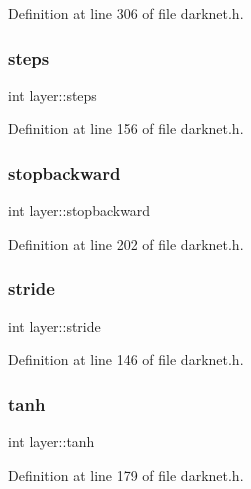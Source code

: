 Definition at line 306 of file darknet.\+h.

\mbox{\label{structlayer_ad060e2cc161c5aa290a76613d024f03a}} 
\subsubsection{\texorpdfstring{steps}{steps}}
{\footnotesize\ttfamily int layer\+::steps}



Definition at line 156 of file darknet.\+h.

\mbox{\label{structlayer_ada9c281fad0eae687276387e0dc5d8d1}} 
\subsubsection{\texorpdfstring{stopbackward}{stopbackward}}
{\footnotesize\ttfamily int layer\+::stopbackward}



Definition at line 202 of file darknet.\+h.

\mbox{\label{structlayer_a239bfd11f56b41f70e2933333f80c81b}} 
\subsubsection{\texorpdfstring{stride}{stride}}
{\footnotesize\ttfamily int layer\+::stride}



Definition at line 146 of file darknet.\+h.

\mbox{\label{structlayer_a386df76b9ede3725ade44f66c45ecdcb}} 
\subsubsection{\texorpdfstring{tanh}{tanh}}
{\footnotesize\ttfamily int layer\+::tanh}



Definition at line 179 of file darknet.\+h.

\mbox{\label{structlayer_a12c40b990c72966e93dc2936c5a91447}} 
